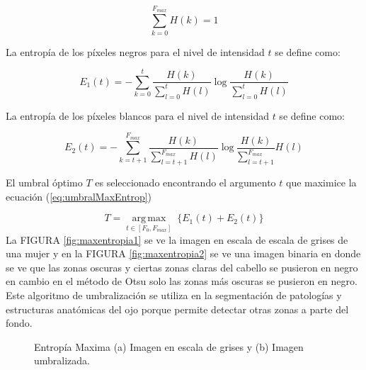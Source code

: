 \begin{equation}
\label{eq:histograma}
\sum_{k=0}^{F_{max}}H(k)=1
\end{equation}

La entropía de los píxeles negros para el nivel de intensidad $t$ se define como:


\begin{equation}
\label{eq:entropiaBlancos}
E_1(t)=-\sum_{k=0}^{t} \frac{H(k)}{\sum_{l=0}^{t}H(l)} \log \frac{H(k)}{\sum_{l=0}^{t}H(l)}
\end{equation}
%

La entropía de los píxeles blancos para el nivel de intensidad $t$ se define como:


\begin{equation}
\label{eq:entropiaNegro}
E_2(t)=-\sum_{k=t+1}^{F_{max}} \frac{H(k)}{\sum_{l=t+1}^{F_{max}}H(l)}\log
\frac{H(k)}{\sum_{l=t+1}^{F_{max}}}H(l)
\end{equation}
%

%
El umbral óptimo $T$ es seleccionado encontrando el argumento $t$  que maximice la ecuación (\ref{eq:umbralMaxEntrop})

\begin{equation}
\label{eq:umbralMaxEntrop}
T= \underset{t\in [F_0,F_{max}]}{\operatorname{arg\,max}} \;\{E_1(t)+E_2(t)\}
\end{equation}
La FIGURA \ref{fig:maxentropia1} se ve la imagen en escala de escala de grises de una mujer y en la FIGURA \ref{fig:maxentropia2} se ve una imagen binaria en donde se ve que las zonas oscuras y ciertas zonas claras del cabello se pusieron en negro en cambio en el método de Otsu solo las zonas más oscuras se pusieron en negro. Este algoritmo de umbralización se utiliza en la segmentación de patologías y estructuras anatómicas del ojo porque permite detectar otras zonas a parte del fondo.
  \begin{figure}[H]
	\centering
	\caption{Entropía Maxima (a) Imagen en escala de grises y (b) Imagen umbralizada.}
	\label{fig:maxentropia}
\end{figure}



